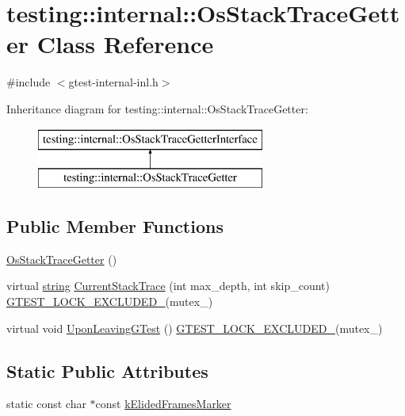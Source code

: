 \hypertarget{classtesting_1_1internal_1_1_os_stack_trace_getter}{}\section{testing\+:\+:internal\+:\+:Os\+Stack\+Trace\+Getter Class Reference}
\label{classtesting_1_1internal_1_1_os_stack_trace_getter}


{\ttfamily \#include $<$gtest-\/internal-\/inl.\+h$>$}

Inheritance diagram for testing\+:\+:internal\+:\+:Os\+Stack\+Trace\+Getter\+:\begin{figure}[H]
\begin{center}
\leavevmode
\includegraphics[height=2.000000cm]{classtesting_1_1internal_1_1_os_stack_trace_getter}
\end{center}
\end{figure}
\subsection*{Public Member Functions}
\begin{DoxyCompactItemize}
\item 
\hyperlink{classtesting_1_1internal_1_1_os_stack_trace_getter_aa40b3120c0ae4ec640de8b577ab7da17}{Os\+Stack\+Trace\+Getter} ()
\item 
virtual \hyperlink{namespacetesting_1_1internal_a8e8ff5b11e64078831112677156cb111}{string} \hyperlink{classtesting_1_1internal_1_1_os_stack_trace_getter_afe0f7539f1a325eec1adf0625bbdfbd7}{Current\+Stack\+Trace} (int max\+\_\+depth, int skip\+\_\+count) \hyperlink{gtest-port_8h_a69abff5a4efdd07bd5faebe3dd318d06}{G\+T\+E\+S\+T\+\_\+\+L\+O\+C\+K\+\_\+\+E\+X\+C\+L\+U\+D\+E\+D\+\_\+}(mutex\+\_\+)
\item 
virtual void \hyperlink{classtesting_1_1internal_1_1_os_stack_trace_getter_abdfefeba8ffb0f1031491e4bd1a7fad9}{Upon\+Leaving\+G\+Test} () \hyperlink{gtest-port_8h_a69abff5a4efdd07bd5faebe3dd318d06}{G\+T\+E\+S\+T\+\_\+\+L\+O\+C\+K\+\_\+\+E\+X\+C\+L\+U\+D\+E\+D\+\_\+}(mutex\+\_\+)
\end{DoxyCompactItemize}
\subsection*{Static Public Attributes}
\begin{DoxyCompactItemize}
\item 
static const char $\ast$const \hyperlink{classtesting_1_1internal_1_1_os_stack_trace_getter_aa736c26a4ba2b59a7572e7f44bfe269e}{k\+Elided\+Frames\+Marker}
\end{DoxyCompactItemize}


